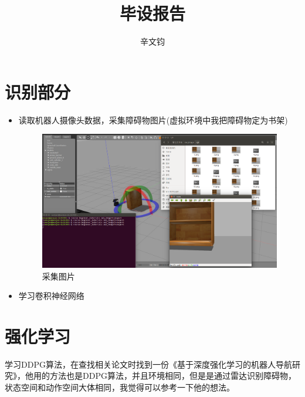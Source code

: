 \documentclass[a4paper]{article}
\title{毕设报告}
\author{辛文钧}
\begin{document}
	\maketitle
	\section{识别部分}
	\begin{itemize}
		\item 读取机器人摄像头数据，采集障碍物图片(虚拟环境中我把障碍物定为书架)
		\begin{figure}
			\centering
			\includegraphics[scale=0.25]{sample.png}
			\caption{采集图片}
		\end{figure}
		
		\item 学习卷积神经网络
	\end{itemize}
	\section{强化学习}
	学习DDPG算法，在查找相关论文时找到一份《基于深度强化学习的机器人导航研究》，他用的方法也是DDPG算法，并且环境相同，但是是通过雷达识别障碍物，状态空间和动作空间大体相同，我觉得可以参考一下他的想法。
\end{document}
